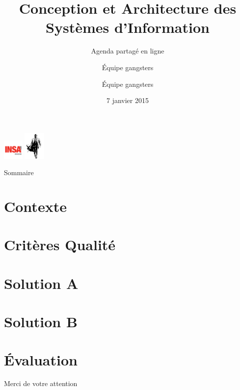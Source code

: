 \documentclass[9pt,table]{beamer}
\title{Conception et Architecture des Systèmes d'Information}
\subtitle{Agenda partagé en ligne}
\author{Équipe gangsters}
\date{7 janvier 2015}
\begin{document}
\begin{frame}[plain]
	\titlepage
	\begin{center}
		\includegraphics[height=10mm]{images/logoInsa} \hspace{0.5cm}
		\includegraphics[height=14mm]{images/logoGangsters} \hspace{0.5cm}
	\end{center}
\end{frame}

\begin{frame}{Sommaire}
	 \vspace{1cm}
	 \tableofcontents
\end{frame}
\section{Contexte}


\section{Critères Qualité}


\section{Solution A}


\section{Solution B}


\section{\'Evaluation}


\author{Équipe gangsters}
\begin{frame}{}
\vspace{2cm}
  \begin{center}
    \Huge Merci de votre attention \normalsize
  \end{center}
\vspace{2cm}
\end{frame}
\end{document}
